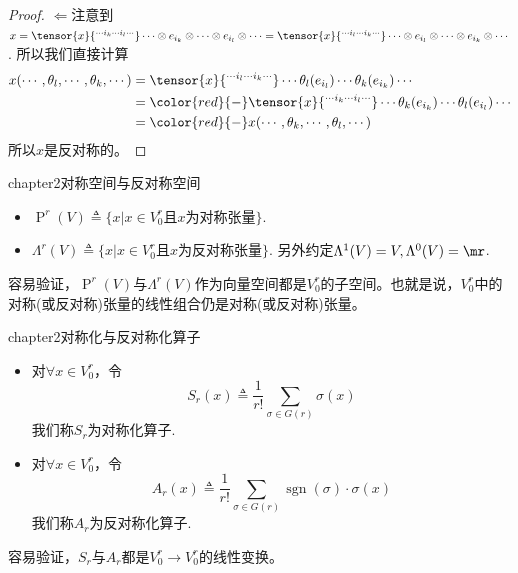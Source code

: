 \begin{proof}
$\Leftarrow$注意到$x=\tensor{x}{^{\cdots i_{k}\cdots i_{l}\cdots }}\cdots \otimes e_{i_{k}}\otimes \cdots\otimes e_{i_{l}}\otimes\cdots=\tensor{x}{^{\cdots i_{l}\cdots i_{k}\cdots }}\cdots \otimes e_{i_{l}}\otimes \cdots\otimes e_{i_{k}}\otimes\cdots$.
所以我们直接计算
\[
\begin{split}
	x(\cdots,\theta_{l},\cdots,\theta_{k},\cdots)&=\tensor{x}{^{\cdots i_{l}\cdots i_{k}\cdots }}\cdots\theta_{l}(e_{i_{l}})\cdots\theta_{k}(e_{i_{k}})\cdots\\
&={\color{red}{-}}\tensor{x}{^{\cdots i_{k}\cdots i_{l}\cdots }}\cdots  \theta_{k}(e_{i_{k}}) \cdots \theta_{l}(e_{i_{l}})\cdots\\
&={\color{red}{-}}x(\cdots,\theta_{k},\cdots,\theta_{l},\cdots)
\end{split}
\]
所以$x$是反对称的。
\end{proof}

\begin{mydef}{}{chapter2对称空间与反对称空间}
\begin{itemize}
\item $\operatorname{P}^{r}(V)\triangleq\{x |x\in V^{r}_{0}\text{且} x\text{为对称张量} \}$.
\item $\Lambda^{r}(V)\triangleq \{x |x\in V^{r}_{0}\text{且} x\text{为反对称张量} \}$. 另外约定$\Lambda^{1}(V)=V,\Lambda^{0}(V)=\mr$.
\end{itemize}
\end{mydef}

容易验证，$\operatorname{P}^{r}(V)$与$\Lambda^{r}(V)$作为向量空间都是$V^{r}_{0}$的子空间。也就是说，$V^{r}_{0}$中的对称(或反对称)张量的线性组合仍是对称(或反对称)张量。

\begin{mydef}{}{chapter2对称化与反对称化算子}
\begin{itemize}
\item 对$\forall x\in V^{r}_{0}$，令
         \[
			S_{r}(x)\triangleq \frac{1}{r!}\sum_{\sigma\in G(r)}\sigma(x)
		 \]
		 我们称$S_{r}$为对称化算子.
\item 对$\forall x\in V^{r}_{0}$，令
         \[
			A_{r}(x)\triangleq \frac{1}{r!}\sum_{\sigma\in G(r)}\operatorname{sgn}(\sigma)\cdot \sigma(x)
		 \]
		 我们称$A_{r}$为反对称化算子.
\end{itemize}
\end{mydef}

容易验证，$S_{r}$与$A_{r}$都是$V^{r}_{0}\longrightarrow V^{r}_{0}$的线性变换。

